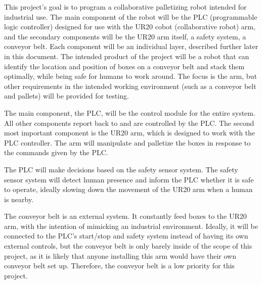 This project's goal is to program a collaborative palletizing robot intended for industrial use. The main component of the robot will be the PLC (programmable logic controller) designed for use with the UR20 cobot (collaborative robot) arm, and the secondary components will be the UR20 arm itself, a safety system, a conveyor belt. Each component will be an individual layer, described further later in this document. The intended product of the project will be a robot that can identify the location and position of boxes on a conveyor belt and stack them optimally, while being safe for humans to work around. The focus is the arm, but other requirements in the intended working environment (such as a conveyor belt and pallets) will be provided for testing.

The main component, the PLC, will be the control module for the entire system. All other components report back to and are controlled by the PLC. The second most important component is the UR20 arm, which is designed to work with the PLC controller. The arm will manipulate and palletize the boxes in response to the commands given by the PLC.

The PLC will make decisions based on the safety sensor system. The safety sensor system will detect human presence and inform the PLC whether it is safe to operate, ideally slowing down the movement of the UR20 arm when a human is nearby.

The conveyor belt is an external system. It constantly feed boxes to the UR20 arm, with the intention of mimicking an industrial environment. Ideally, it will be connected to the PLC's start/stop and safety system instead of having its own external controls, but the conveyor belt is only barely inside of the scope of this project, as it is likely that anyone installing this arm would have their own conveyor belt set up. Therefore, the conveyor belt is a low priority for this project. 
